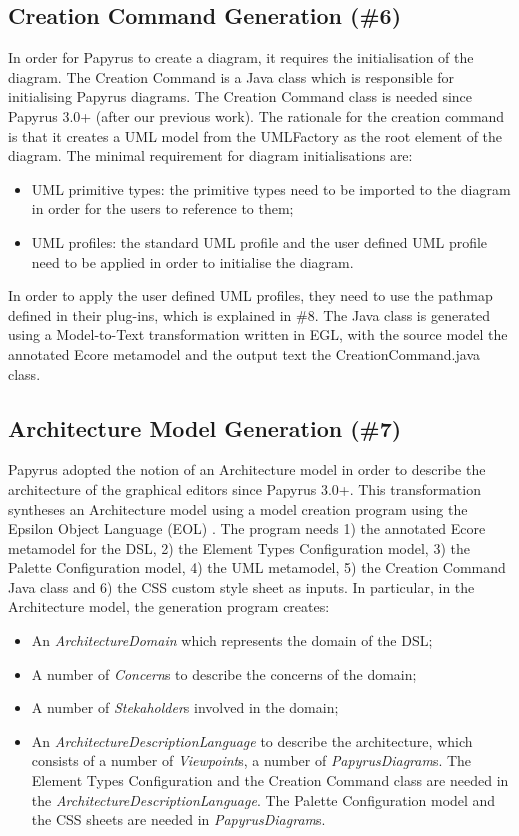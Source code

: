 \subsection{Creation Command Generation (\#6)}
\label{sec:creationCommand}
In order for Papyrus to create a diagram, it requires the initialisation of the diagram.
The Creation Command is a Java class which is responsible for initialising Papyrus diagrams. 
The Creation Command class is needed since Papyrus 3.0+ (after our previous work).
The rationale for the creation command is that it creates a UML model from the UMLFactory as the root element of the diagram.
The minimal requirement for diagram initialisations are:
\begin{itemize}
	\item UML primitive types: the primitive types need to be imported to the diagram in order for the users to reference to them;
	\item UML profiles: the standard UML profile and the user defined UML profile need to be applied in order to initialise the diagram.
\end{itemize}

In order to apply the user defined UML profiles, they need to use the pathmap defined in their plug-ins, which is explained in \#8.
The Java class is generated using a Model-to-Text transformation written in EGL, with the source model the annotated Ecore metamodel and the output text the CreationCommand.java class.

\subsection{Architecture Model Generation (\#7)}
\label{sec:architectureModel}
Papyrus adopted the notion of an Architecture model in order to describe the architecture of the graphical editors since Papyrus 3.0+.
This transformation syntheses an Architecture model using a model creation program using the Epsilon Object Language (EOL) \cite{kolovos2006epsilon}. 
The program needs 1) the annotated Ecore metamodel for the DSL, 2) the Element Types Configuration model, 3) the Palette Configuration model, 4) the UML metamodel, 5) the Creation Command Java class and 6) the CSS custom style sheet as inputs. 
In particular, in the Architecture model, the generation program creates:
\begin{itemize}
	\item An \textit{ArchitectureDomain} which represents the domain of the DSL;
	\item A number of \textit{Concern}s to describe the concerns of the domain;
	\item A number of \textit{Stekaholder}s involved in the domain;
	\item An \textit{ArchitectureDescriptionLanguage} to describe the architecture, which consists of a number of \textit{Viewpoint}s, a number of \textit{PapyrusDiagram}s. 
	The Element Types Configuration and the Creation Command class are needed in the \textit{ArchitectureDescriptionLanguage}. 
	The Palette Configuration model and the CSS sheets are needed in \textit{PapyrusDiagram}s.
\end{itemize}

